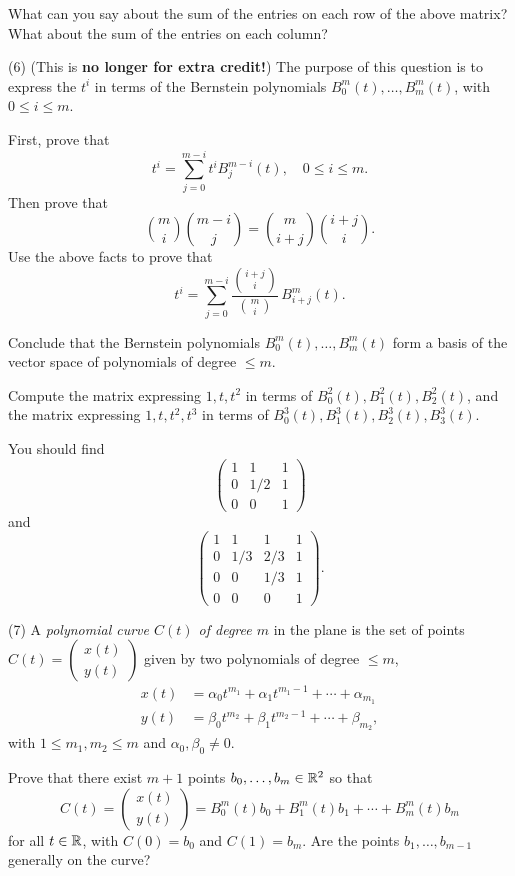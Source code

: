 \documentclass[12pt]{article}
\begin{document}
\medskip
What can you say about the sum of the entries on
each row of the above matrix?
What about the sum of the entries on
each column?


\medskip
(6) (This is {\bf no longer for extra credit!})
The purpose of this question is to express the $t^i$ in terms of
the  Bernstein polynomials  $B_0^m(t), \ldots, B_m^m(t)$,
with $0 \leq i \leq m$.

\medskip
First, prove that
\[
t^i = \sum_{j = 0}^{m - i} t^i B_j^{m - i}(t),
\quad 0 \leq i \leq m. 
\]
Then prove that
\[
\binom{m}{i}\binom{m - i}{j} = \binom{m}{i + j}\binom{i + j}{i}.
\]
Use the above facts to prove that
\[
t^i = \sum_{j = 0}^{m - i} \frac{\binom{i + j}{i}}{\binom{m}{i}}\, B_{i + j}^m(t).
\]

Conclude that the  Bernstein polynomials  $B_0^m(t), \ldots, B_m^m(t)$
form a basis of the vector space of polynomials of degree $\leq m$.

\medskip
Compute the matrix expressing $1, t, t^2$ in terms
of  $B_0^2(t), B_1^2(t), B_2^2(t)$, and the matrix
expressing $1, t, t^2, t^3$ in terms of 
$B_0^3(t), B_1^3(t), B_2^3(t), B_3^3(t)$.

\medskip\noindent
You should find
\[
\begin{pmatrix}
1 & 1 & 1 \\
0 & 1/2 & 1 \\
0 & 0 & 1
\end{pmatrix}
\]
and
\[
\begin{pmatrix}
1 & 1 & 1  & 1\\
0 & 1/3 & 2/3 & 1 \\
0 & 0 & 1/3 & 1\\
0 & 0 & 0 & 1
\end{pmatrix}.
\]

\medskip
(7)
A {\it polynomial curve $C(t)$ of degree $m$\/} in the plane is the set of
points \\
$C(t) =
\begin{pmatrix}
x(t) \\
y(t)
\end{pmatrix}$
given by two polynomials
of degree $\leq m$, 
\begin{align*}
x(t) & = \alpha_0t^{m_1} + \alpha_1t^{m_1 - 1} + \cdots + \alpha_{m_1} \\
y(t) & = \beta_0t^{m_2} + \beta_1t^{m_2 - 1} + \cdots + \beta_{m_2}, 
\end{align*}
with $1 \leq m_1, m_2 \leq m$ and $\alpha_0, \beta_0 \not = 0$.

\medskip
Prove that there exist $m + 1$ points $b_0, \ldots, b_m\in \mathbb{R}^2$ so that
\[
C(t) = 
\begin{pmatrix}
x(t) \\
y(t) 
\end{pmatrix}
= 
B_0^m(t) b_0 + B_1^m(t) b_1 + \cdots + B_m^m(t) b_m
\]
for all $t\in \mathbb{R}$, with
$C(0) = b_0$ and $C(1) = b_m$.
Are the points $b_1, \ldots, b_{m - 1}$ generally on the curve?
\end{document}
